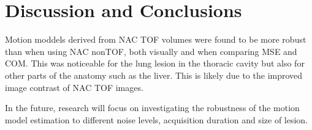 \documentclass{IEEEtran}
\begin{document}
\vspace{-0.2cm}

\section{Discussion and Conclusions}
Motion moddels derived from NAC TOF volumes were found to be more robust than when using NAC nonTOF, both visually and when comparing MSE and COM. This was noticeable for the lung lesion in the thoracic cavity but also for other parts of the anatomy such as the liver. This is likely due to the improved image contrast of NAC TOF images.

In the future, research will focus on investigating the robustness of the motion model estimation to different noise levels, acquisition duration and size of lesion.

\vspace{-0.2cm}
\AtNextBibliography{\small}
\printbibliography
\vspace{-0.2cm}
\end{document}
